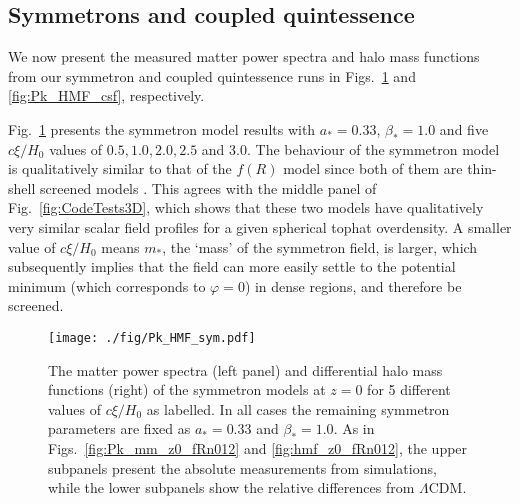 \subsection{Symmetrons and coupled quintessence}
\label{subsect:sym_csf_runs}

We now present the measured matter power spectra and halo mass functions from our symmetron and coupled quintessence runs in Figs.~\ref{fig:Pk_hmf_z0_sym} and \ref{fig:Pk_HMF_csf}, respectively.

Fig.~\ref{fig:Pk_hmf_z0_sym} presents the symmetron model results with $a_\ast = 0.33$, $\beta_\ast = 1.0$ and five $c\xi/H_0$ values of $0.5, 1.0, 2.0, 2.5$ and $3.0$.
The behaviour of the symmetron model is qualitatively similar to that of the $f(R)$ model since both of them are thin-shell screened models \citep{Brax:2012gr}. This agrees with the middle panel of Fig.~\ref{fig:CodeTests3D}, which shows that these two models have qualitatively very similar scalar field profiles for a given spherical tophat overdensity. A smaller value of $c\xi/H_0$ means $m_\ast$, the `mass' of the symmetron field, is larger, which subsequently implies that the field can more easily settle to the potential minimum (which corresponds to $\varphi=0$) in dense regions, and therefore be screened. 



\begin{figure}
    \centering 
    \texttt{[image: ./fig/Pk\_HMF\_sym.pdf]}
    \caption{The matter power spectra (left panel) and differential halo mass functions (right) of the symmetron models at $z=0$ for 5 different values of $c\xi/H_0$ as labelled. In all cases the remaining symmetron parameters are fixed as $a_\ast=0.33$ and $\beta_\ast=1.0$. As in Figs.~\ref{fig:Pk_mm_z0_fRn012} and \ref{fig:hmf_z0_fRn012}, the upper subpanels present the absolute measurements from simulations, while the lower subpanels show the relative differences from $\Lambda$CDM.
    }
    \label{fig:Pk_hmf_z0_sym}
\end{figure}


